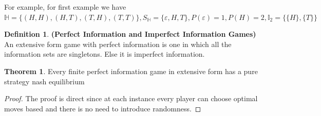 \documentclass{article}
\theoremstyle{definition}
\newtheorem{theorem}{Theorem}[section]
\newtheorem{defn}{Definition}[section]
\begin{document}
For example, for first example we have $\mathbb{H} = \{(H,H),(H,T),(T,H),(T,T)\}, S_{\mathbb{H}} = \{\varepsilon, H, T\}, P(\varepsilon) = 1, P(H) = 2, \mathbb{I}_2 = \{\{H\},\{T\}\}$
\begin{defn}
\textbf{(Perfect Information and Imperfect Information Games)} An extensive form game with perfect information is one in which all the information sets are singletons. Else it is imperfect information.
\end{defn}
\begin{theorem}
Every finite perfect information game in extensive form has a pure strategy nash equilibrium
\end{theorem}
\begin{proof}
The proof is direct since at each instance every player can choose optimal moves based and there is no need to introduce randomness.
\end{proof}
\end{document}
